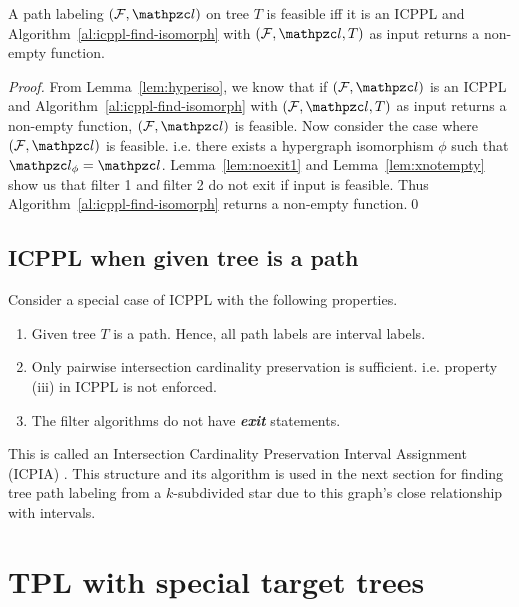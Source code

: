 \documentclass[MS]             %
              {iitmdiss_as}    %
\begin{document}
\begin{theorem}
  \label{th:charac}
  A path labeling $(\cF, \cl)$ on tree $T$ is feasible iff it is an
  ICPPL and Algorithm~\ref{al:icppl-find-isomorph} with $(\cF, \cl,
  T)$ as input returns a non-empty function.
\end{theorem}
\begin{proof}
  From Lemma~\ref{lem:hyperiso}, we know that if $(\cF, \cl)$ is an
  ICPPL and Algorithm~\ref{al:icppl-find-isomorph} with $(\cF, \cl,
  T)$ as input returns a non-empty function, $(\cF, \cl)$ is feasible.
  Now consider the case where $(\cF, \cl)$ is feasible. i.e. there
  exists a hypergraph isomorphism $\phi$ such that $\cl_\phi =
  \cl$. Lemma~\ref{lem:noexit1} and Lemma~\ref{lem:xnotempty} show us
  that filter 1 and filter 2 do not exit if input is feasible. Thus
  Algorithm~\ref{al:icppl-find-isomorph} returns a non-empty function.\qed
\end{proof}


\subsection{ICPPL when given tree is a path}
\label{subsec:icpplicpia}

Consider a special case of ICPPL with the following properties.
\begin{enumerate}
\item Given tree $T$ is a path. Hence, all path labels are interval labels.
\item Only pairwise intersection cardinality
  preservation is sufficient. i.e. property (iii) in ICPPL is not enforced.
\item The filter algorithms do not have {\em \bf exit} statements.
\end{enumerate}
This is called an Intersection Cardinality Preservation Interval
Assignment (ICPIA) \cite{nsnrs09}. This structure and its algorithm is
used in the next section for finding tree path labeling from a
$k$-subdivided star due to this graph's close relationship with
intervals. 

\section{ TPL with special target trees}
\label{sec:spltargettree}
\end{document}
